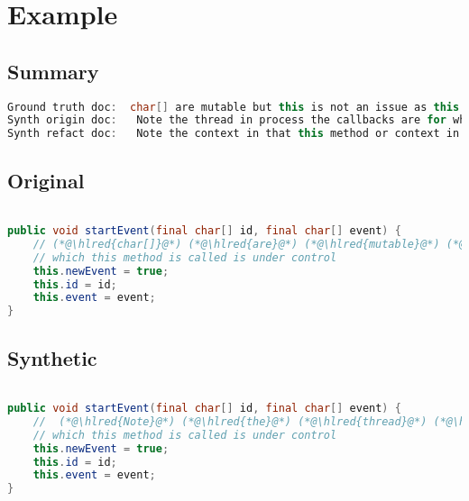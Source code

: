 \documentclass[11pt]{article}
\DeclareRobustCommand{\hlred}[1]{{\sethlcolor{YellowOrange}\hl{#1}}}
\begin{document}
\pagebreak
\section{Example}
\subsection{Summary}

\begin{lstlisting}[language=java]
Ground truth doc:  char[] are mutable but this is not an issue as this class is package-protected and the code from
Synth origin doc:   Note the thread in process the callbacks are for which event listeners and thus that it identifies a
Synth refact doc:   Note the context in that this method or context in other code is ignored since only that method called
\end{lstlisting}

\subsection{Original}
\begin{lstlisting}[language=java]

public void startEvent(final char[] id, final char[] event) {
    // (*@\hlred{char[]}@*) (*@\hlred{are}@*) (*@\hlred{mutable}@*) (*@\hlred{but}@*) (*@\hlred{this}@*) (*@\hlred{is}@*) (*@\hlred{not}@*) (*@\hlred{an}@*) (*@\hlred{issue}@*) (*@\hlred{as}@*) (*@\hlred{this}@*) (*@\hlred{class}@*) (*@\hlred{is}@*) (*@\hlred{package-protected}@*) (*@\hlred{and}@*) (*@\hlred{the}@*) (*@\hlred{code}@*) (*@\hlred{from}@*)
    // which this method is called is under control
    this.newEvent = true;
    this.id = id;
    this.event = event;
}
\end{lstlisting}
\subsection{Synthetic}

\begin{lstlisting}[language=java]

public void startEvent(final char[] id, final char[] event) {
    //  (*@\hlred{Note}@*) (*@\hlred{the}@*) (*@\hlred{thread}@*) (*@\hlred{in}@*) (*@\hlred{process}@*) (*@\hlred{the}@*) (*@\hlred{callbacks}@*) (*@\hlred{are}@*) (*@\hlred{for}@*) (*@\hlred{which}@*) (*@\hlred{event}@*) (*@\hlred{listeners}@*) (*@\hlred{and}@*) (*@\hlred{thus}@*) (*@\hlred{that}@*) (*@\hlred{it}@*) (*@\hlred{identifies}@*) (*@\hlred{a}@*)
    // which this method is called is under control
    this.newEvent = true;
    this.id = id;
    this.event = event;
}
\end{lstlisting}
\end{document}
